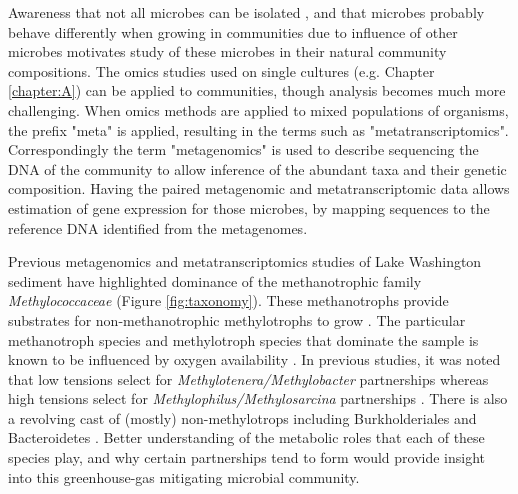 Awareness that not all microbes can be isolated \cite{kaeberlein2002, stewart2012}, and that microbes probably behave differently when growing in communities due to influence of other microbes \cite{yu2016synthetic} motivates study of these microbes in their natural community compositions.
The omics studies used on single cultures (e.g. Chapter \ref{chapter:A}) can be applied to communities, though analysis becomes much more challenging.
When omics methods are applied to mixed populations of organisms, the prefix "meta" is applied, resulting in the terms such as  "metatranscriptomics".
Correspondingly the term "metagenomics" is used to describe sequencing the DNA of the community to allow inference of the abundant taxa and their genetic composition.
Having the paired metagenomic and metatranscriptomic data allows estimation of gene expression for those microbes, by mapping sequences to the reference DNA identified from the metagenomes.

Previous metagenomics and metatranscriptomics studies of Lake Washington sediment have highlighted dominance of the methanotrophic family \textit{Methylococcaceae} \cite{beck2013LW, beck2014LW, oshkin2015LW, hernandez2015LW} (Figure \ref{fig:taxonomy}).
These methanotrophs provide substrates for non-methanotrophic methylotrophs to grow \cite{beck2013LW}.
The particular methanotroph species and methylotroph species that dominate the sample is known to be influenced by oxygen availability \cite{hernandez2015LW}.
In previous studies, it was noted that low  tensions select for \mbox{\textit{Methylotenera/Methylobacter}} partnerships whereas high  tensions select for  \mbox{\textit{Methylophilus/Methylosarcina}} partnerships \cite{hernandez2015LW}.
There is also a revolving cast of (mostly) non-methylotrops including Burkholderiales and Bacteroidetes \cite{kalyuzhnaya2008Burkholderiales, beck2014LW}.  %
Better understanding of the metabolic roles that each of these species play, and why certain partnerships tend to form would provide insight into this greenhouse-gas mitigating microbial community.

